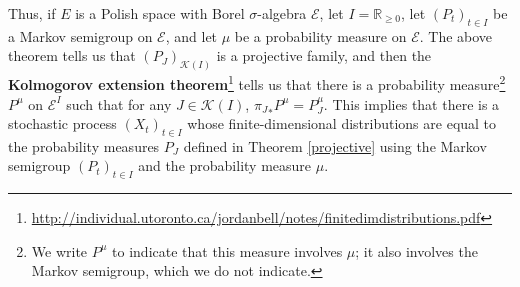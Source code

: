 \documentclass{article}
\theoremstyle{definition}
\begin{document}
Thus, if $E$ is a Polish space with Borel $\sigma$-algebra $\mathscr{E}$,
let $I=\mathbb{R}_{\geq 0}$,
let $(P_t)_{t \in I}$ be a Markov semigroup 
on $\mathscr{E}$, and let $\mu$ be a probability measure on $\mathscr{E}$.
The above theorem tells us that $(P_J)_{\mathscr{K}(I)}$ is a projective family, and then
the \textbf{Kolmogorov extension theorem}\footnote{\url{http://individual.utoronto.ca/jordanbell/notes/finitedimdistributions.pdf}}
tells us that there is a probability measure\footnote{We write $P^\mu$ to indicate that this measure
involves $\mu$; it also involves the Markov semigroup, which we do not indicate.} $P^\mu$ on $\mathscr{E}^I$ such that 
for any $J \in \mathscr{K}(I)$, ${\pi_J}_* P^\mu = P^\mu_J$. This implies that
there is a stochastic process 
$(X_t)_{t \in I}$ whose finite-dimensional distributions are equal 
to the probability measures $P_J$ defined in Theorem \ref{projective} using the Markov semigroup $(P_t)_{t \in I}$ and the probability
measure $\mu$. 
\end{document}
